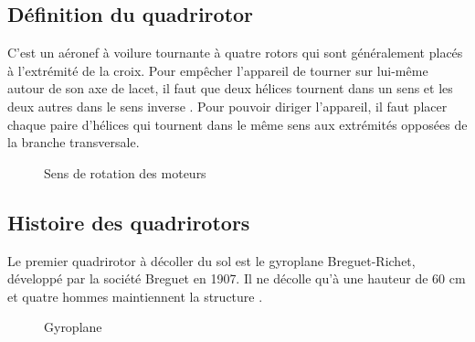 \subsection{Définition du quadrirotor}
C'est un aéronef à voilure tournante à quatre rotors qui sont généralement placés à l'extrémité de la croix. Pour empêcher l'appareil de tourner sur lui-même autour de son axe de lacet, il faut que deux hélices tournent dans un sens et les deux autres dans le sens inverse \cite{Wikipidea}. Pour pouvoir diriger l'appareil, il faut placer chaque paire d'hélices qui tournent dans le même sens aux extrémités opposées de la branche transversale.
\begin{figure}[H] 
\begin{center} 
	\centering
\end{center}
\caption{Sens de rotation des moteurs }
\end{figure}
\subsection{Histoire des quadrirotors}
Le premier quadrirotor à décoller du sol est le gyroplane Breguet-Richet, développé par la société Breguet en 1907. Il ne décolle qu'à une hauteur de 60 cm et quatre hommes maintiennent la structure \cite{Wikipidea}. 
\begin{figure}[H] 
\begin{center} 
	\centering
	
\end{center}
\caption{Gyroplane }
\end{figure}

